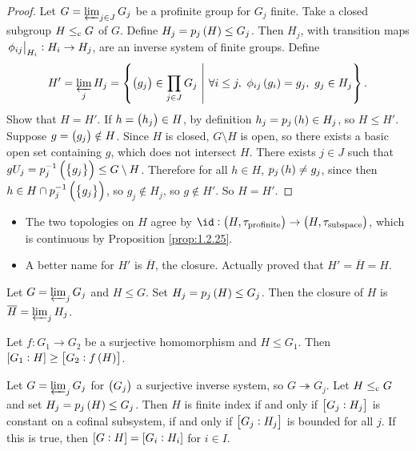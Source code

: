\begin{proof}
Let $ G = \varprojlim_{j \in J} G_j $ be a profinite group for $ G_j $ finite. Take a closed subgroup $ H \le_{\mathrm{c}} G $ of $ G $. Define $ H_j = p_j\br{H} \le G_j $. Then $ H_j $, with transition maps $ \left. \phi_{ij} \right|_{H_i} : H_i \to H_j $, are an inverse system of finite groups. Define
$$ H' = \varprojlim_j H_j = \cbr{\br{g_j} \in \prod_{j \in J} G_j \st \forall i \le j, \ \phi_{ij}\br{g_i} = g_j, \ g_j \in H_j}. $$
Show that $ H = H' $. If $ h = \br{h_j} \in H $, by definition $ h_j = p_j\br{h} \in H_j $, so $ H \le H' $. Suppose $ g = \br{g_j} \notin H $. Since $ H $ is closed, $ G \setminus H $ is open, so there exists a basic open set containing $ g $, which does not intersect $ H $. There exists $ j \in J $ such that $ gU_j = p_j^{-1}\br{\cbr{g_j}} \le G \setminus H $. Therefore for all $ h \in H $, $ p_j\br{h} \ne g_j $, since then $ h \in H \cap p_j^{-1}\br{\cbr{g_j}} $, so $ g_j \notin H_j $, so $ g \notin H' $. So $ H = H' $.
\end{proof}

\begin{remark*}
\hfill
\begin{itemize}
\item The two topologies on $ H $ agree by $ \id : \br{H, \tau_{\text{profinite}}} \to \br{H, \tau_{\text{subspace}}} $, which is continuous by Proposition \ref{prop:1.2.25}.
\item A better name for $ H' $ is $ \overline{H} $, the closure. Actually proved that $ H' = \overline{H} = H $.
\end{itemize}
\end{remark*}

\begin{proposition}
Let $ G = \varprojlim_j G_j $ and $ H \le G $. Set $ H_j = p_j\br{H} \le G_j $. Then the closure of $ H $ is $ \overline{H} = \varprojlim_j H_j $.
\end{proposition}

\begin{lemma}
Let $ f : G_1 \to G_2 $ be a surjective homomorphism and $ H \le G_1 $. Then $ \sbr{G_1 : H} \ge \sbr{G_2 : f\br{H}} $.
\end{lemma}

\begin{proposition}
Let $ G = \varprojlim_j G_j $ for $ \br{G_j} $ a surjective inverse system, so $ G \twoheadrightarrow G_j $. Let $ H \le_{\mathrm{c}} G $ and set $ H_j = p_j\br{H} \le G_j $. Then $ H $ is finite index if and only if $ \sbr{G_j : H_j} $ is constant on a cofinal subsystem, if and only if $ \sbr{G_j : H_j} $ is bounded for all $ j $. If this is true, then $ \sbr{G : H} = \sbr{G_i : H_i} $ for $ i \in I $.
\end{proposition}

